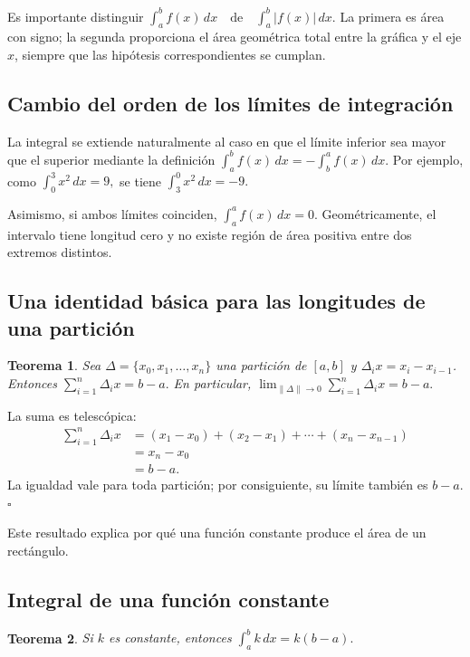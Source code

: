 \documentclass[12pt]{article}
\newtheorem{Teo}{Teorema}
\begin{document}
Es importante distinguir
$
\boxed{\int_a^b f(x)\,dx}
\quad\text{de}\quad
\boxed{\int_a^b |f(x)|\,dx}.
$
La primera es área con signo; la segunda proporciona el área geométrica total
entre la gráfica y el eje $x$, siempre que las hipótesis correspondientes se
cumplan.
\subsection*{Cambio del orden de los límites de integración}
La integral se extiende naturalmente al caso en que el límite inferior sea
mayor que el superior mediante la definición
$
\boxed{
\int_a^b f(x)\,dx=-\int_b^a f(x)\,dx.
}
$
Por ejemplo, como
$
\int_0^3 x^2\,dx=9,
$
se tiene
$
\int_3^0 x^2\,dx=-9.
$

Asimismo, si ambos límites coinciden,
$
\boxed{\int_a^a f(x)\,dx=0.}
$
Geométricamente, el intervalo tiene longitud cero y no existe región de área
positiva entre dos extremos distintos.
\subsection*{Una identidad básica para las longitudes de una partición}
\begin{Teo}
Sea
$
\Delta=\{x_0,x_1,\ldots,x_n\}
$
una partición de $[a,b]$ y $\Delta_i x=x_i-x_{i-1}$. Entonces
$
\sum_{i=1}^n\Delta_i x=b-a.
$
En particular,
$
\lim_{\|\Delta\|\to0}\sum_{i=1}^n\Delta_i x=b-a.
$
\end{Teo}

La suma es telescópica:
\begin{align*}
\sum_{i=1}^n\Delta_i x
&=(x_1-x_0)+(x_2-x_1)+\cdots +(x_n-x_{n-1})\\
&=x_n-x_0\\
&=b-a.
\end{align*}
La igualdad vale para toda partición; por consiguiente, su límite también es
$b-a$.
\hfill$\square$

Este resultado explica por qué una función constante produce el área de un
rectángulo.
\subsection*{Integral de una función constante}
\begin{Teo}
Si $k$ es constante, entonces
$
\boxed{\int_a^b k\,dx=k(b-a).}
$
\end{Teo}
\end{document}
